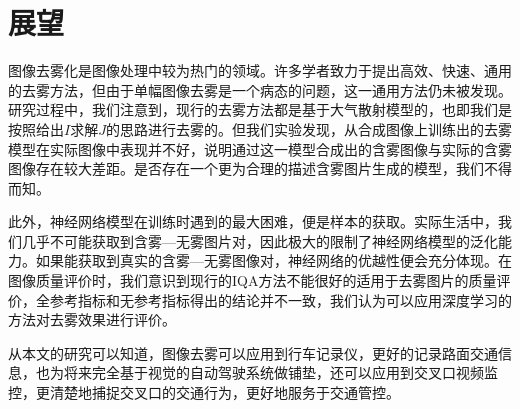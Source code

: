 \documentclass[a4paper, 12pt, oneside]{report}
\begin{document}
{\section{展望\quad}
图像去雾化是图像处理中较为热门的领域。许多学者致力于提出高效、快速、通用的去雾方法，但由于单幅图像去雾是一个病态的问题，这一通用方法仍未被发现。研究过程中，我们注意到，现行的去雾方法都是基于大气散射模型的，也即我们是按照给出$I$求解$J$的思路进行去雾的。但我们实验发现，从合成图像上训练出的去雾模型在实际图像中表现并不好，说明通过这一模型合成出的含雾图像与实际的含雾图像存在较大差距。是否存在一个更为合理的描述含雾图片生成的模型，我们不得而知。

此外，神经网络模型在训练时遇到的最大困难，便是样本的获取。实际生活中，我们几乎不可能获取到含雾—无雾图片对，因此极大的限制了神经网络模型的泛化能力。如果能获取到真实的含雾—无雾图像对，神经网络的优越性便会充分体现。在图像质量评价时，我们意识到现行的IQA方法不能很好的适用于去雾图片的质量评价，全参考指标和无参考指标得出的结论并不一致，我们认为可以应用深度学习的方法对去雾效果进行评价。

从本文的研究可以知道，图像去雾可以应用到行车记录仪，更好的记录路面交通信息，也为将来完全基于视觉的自动驾驶系统做铺垫，还可以应用到交叉口视频监控，更清楚地捕捉交叉口的交通行为，更好地服务于交通管控。


} %
\end{document}
